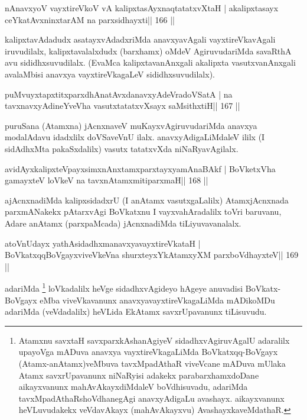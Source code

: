
\begin{shl}
nAnavxyoV vayxtireVkoV vA kalipxtasAyxnaqtatatxvXtaH |
akalipxtasayx ceYkatAvxninxtarAM na parxsidhayxti\hfill || 166 ||
\end{shl}

\begin{artha}
kalipxtavAdadudx asatayxvAdadxriMda anavxyavAgali vayxtireVkavAgali 
iruvudilalx, kalipxtavalalxdudx (barxhamx) oMdeV AgiruvudariMda savaRthA avu sididhxsuvudilalx. (EvaMca kalipxtavanAnxgali akalipxta vasutxvanAnxgali avalaMbisi anavxya vayxtireVkagaLeV sididhxsuvudilalx).
\end{artha}


\begin{shl}
puMvuyxtapxtitxparxdhAnatAvxdanavxyAdeVradoVSatA |
na tavxnavxyAdineYveVha vasutxtatatxvXsayx saMsithxtiH\hfill || 167 ||
\end{shl}

\begin{artha}
puruSana (Atamxna) jAcnxnaveV muKayxvAgiruvudariMda anavxya modalAdavu idadxlilx doVSaveVnU ilalx. anavxyAdigaLiMdaleV ililx (I sidAdhxMta pakaSxdalilx) vasutx tatatxvXda niNaRyavAgilalx.
\end{artha}

\begin{shl}
avidAyxkalipxteV\s payxsimxnAnxtamxparxtayxyamAnaBAkf |
BoVketxVha gamayxteV loVkeV na tavxnAtamxmitiparxmaH\hfill || 168 ||
\end{shl}

\begin{artha}
ajAcnxnadiMda kalipxsidadxrU (I anAtamx vasutxgaLalilx) AtamxjAcnxnada  parxmANakekx pAtarxvAgi BoVkatxnu I vayxvahAradalilx toVri baruvanu, Adare anAtamx (parxpaMcada) jAcnxnadiMda tiLiyuvavanalalx.
\end{artha}

\begin{shl}
atoV\s nUdayx yathAsidadhxmanavxyavayxtireVkataH |
BoVkatxqqBoVgayxviveVkeVna shurxteyxYkAtamxyXM parxboVdhayxteV\hfill || 169 ||
\end{shl}

\begin{artha}
adariMda \footnote{Atamxnu savxtaH savxparxkAshanAgiyeV  sidadhxvAgiruvAgalU adaralilx upayoVga mADuva anavxya vayxtireVkagaLiMda BoVkatxqq-BoVgayx (Atamx-anAtamx)veMbuva tavxMpadAthaR viveVcane mADuva mUlaka Atamx savxrUpavanunx niNaRyisi adakekx parabarxhamxdoDane aikayxvanunx mahAvAkayxdiMdaleV boVdhisuvadu, adariMda tavxMpadAthaRshoVdhanegAgi anavxyAdigaLu avashayx. aikayxvanunx heVLuvudakekx veVdavAkayx (mahAvAkayxvu) AvashayxkaveMdathaR.} loVkadalilx heVge sidadhxvAgideyo hAgeye anuvadisi BoVkatx- BoVgayx eMba viveVkavanunx anavxyavayxtireVkagaLiMda mADikoMDu adariMda (veVdadalilx) heVLida EkAtamx savxrUpavanunx tiLisuvudu.
\end{artha}

